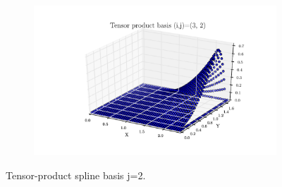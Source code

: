 \documentclass[11pt,letterpaper]{article}
\begin{document}
\begin{figure}[!tbh]
\begin{subfigure}[b]{.6\textwidth}
    \caption{}
    \label{fig4:label:c}
  \end{subfigure}
  \hfill
  \begin{subfigure}[b]{.6\textwidth}
    \includegraphics[width=\textwidth]{problem_2_2_3_2.pdf}
    \caption{}
    \label{fig4:label:d}
  \end{subfigure}
  \caption{Tensor-product spline basis j=2. }
  \end{figure}
  
\end{document}
